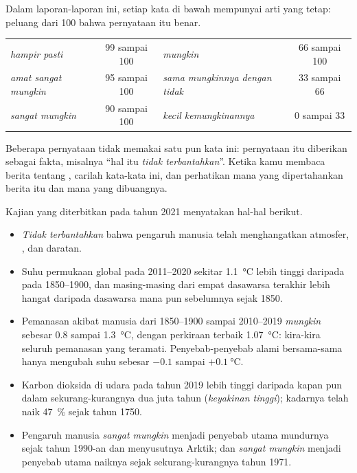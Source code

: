 Dalam laporan-laporan ini, setiap kata di bawah mempunyai arti yang
tetap: peluang dari 100 bahwa pernyataan itu benar.

\begin{center}
{\small
\begin{tabular}{|l|c||l|c|}
\hline
\emph{hampir pasti} & 99 sampai 100 & \emph{mungkin} & 66 sampai 100 \\
\emph{amat sangat mungkin} & 95 sampai 100 & \emph{sama mungkinnya dengan tidak} & 33 sampai 66 \\
\emph{sangat mungkin} & 90 sampai 100 & \emph{kecil kemungkinannya} & 0 sampai 33 \\
\hline
\end{tabular}}
\end{center}

\noindent Beberapa pernyataan tidak memakai satu pun kata ini: pernyataan
itu diberikan sebagai fakta, misalnya ``hal itu \emph{tidak
terbantahkan}''. Ketika kamu membaca berita tentang , carilah
kata-kata ini, dan perhatikan mana yang dipertahankan berita itu dan mana
yang dibuangnya.

Kajian yang diterbitkan pada tahun 2021 menyatakan hal-hal berikut.
\begin{itemize}
  \item \emph{Tidak terbantahkan} bahwa pengaruh manusia telah
        menghangatkan atmosfer, , dan daratan.
  \item Suhu permukaan global pada 2011--2020 sekitar
        \qty{1.1}{\degreeCelsius} lebih tinggi daripada pada 1850--1900,
        dan masing-masing dari empat dasawarsa terakhir lebih hangat
        daripada dasawarsa mana pun sebelumnya sejak 1850.
  \item Pemanasan akibat manusia dari 1850--1900 sampai 2010--2019
        \emph{mungkin} sebesar 0.8 sampai \qty{1.3}{\degreeCelsius},
        dengan perkiraan terbaik \qty{1.07}{\degreeCelsius}: kira-kira
        seluruh pemanasan yang teramati. Penyebab-penyebab alami bersama-sama
        hanya mengubah suhu sebesar $-0.1$ sampai $+\qty{0.1}{\degreeCelsius}$.
  \item Karbon dioksida di udara pada tahun 2019 lebih tinggi daripada
        kapan pun dalam sekurang-kurangnya dua juta tahun (\emph{keyakinan
        tinggi}); kadarnya telah naik 47~\% sejak tahun 1750.
  \item Pengaruh manusia \emph{sangat mungkin} menjadi penyebab utama
        mundurnya  sejak tahun 1990-an dan menyusutnya 
        Arktik; dan \emph{sangat mungkin} menjadi penyebab utama naiknya
         sejak sekurang-kurangnya tahun 1971.
\end{itemize}

